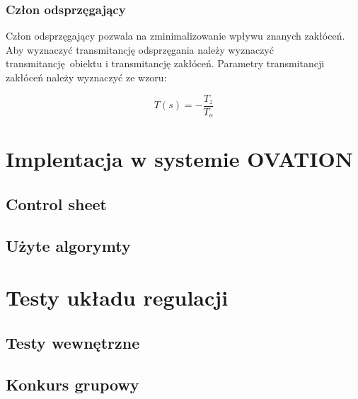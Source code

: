 \documentclass{mwrep}
\begin{document}
\subsection{Człon odsprzęgający}
\label{Odsprzeganie}

Człon odsprzęgający pozwala na zminimalizowanie wpływu znanych zakłóceń. Aby wyznaczyć transmitancję odsprzęgania należy 
wyznaczyć transmitancję obiektu i transmitancję zakłóceń. Parametry transmitancji zakłóceń należy  wyznaczyć ze wzoru:

$$T(s) = - \frac{T_z}{T_o}$$


\chapter{Implentacja w systemie OVATION}
\label{OVATION}

\section{Control sheet}
\label{ControlSheet}

\section{Użyte algorymty}
\label{AlgorytmyOVATION}

\chapter{Testy układu regulacji}
\label{Testy}

\section{Testy wewnętrzne}
\label{TestyWewnetrzne}

\section{Konkurs grupowy}
\label{Konkurs}
\end{document}
